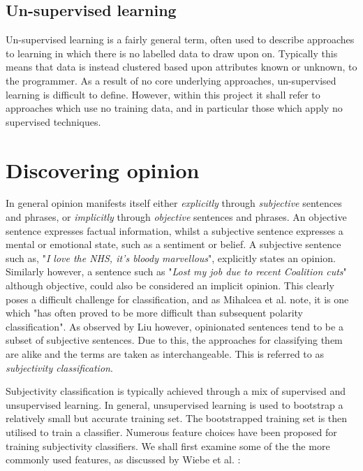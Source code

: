 \subsection{Un-supervised learning}

Un-supervised learning is a fairly general term, often used to describe approaches to learning in which there is no labelled data to draw upon on. Typically this means that data is instead clustered based upon attributes known or unknown, to the programmer. As a result of no core underlying approaches, un-supervised learning is difficult to define. However, within this project it shall refer to approaches which use no training data, and in particular those which apply no supervised techniques.

\section{Discovering opinion}
\label{background:discovering_opinion}

In general opinion manifests itself either \emph{explicitly} through \emph{subjective} sentences and phrases, or \emph{implicitly} through \emph{objective} sentences and phrases. An objective sentence expresses factual information, whilst a subjective sentence expresses a mental or emotional state, such as a sentiment or belief. A subjective sentence such as, "\emph{I love the NHS, it's bloody marvellous}", explicitly states an opinion. Similarly however, a sentence such as "\emph{Lost my job due to recent Coalition cuts}" although objective, could also be considered an implicit opinion. This clearly poses a difficult challenge for classification, and as Mihalcea et al. \cite{Mihalcea:2007uh} note, it is one which "has often proved to be more difficult than subsequent polarity classification". As observed by Liu \cite{Liu:2010tm} however, opinionated sentences tend to be a subset of subjective sentences. Due to this, the approaches for classifying them are alike and the terms are taken as interchangeable. This is referred to as \emph{subjectivity classification}.

Subjectivity classification is typically achieved through a mix of supervised and unsupervised learning. In general, unsupervised learning is used to bootstrap a relatively small but accurate training set. The bootstrapped training set is then utilised to train a classifier. Numerous feature choices have been proposed for training subjectivity classifiers. We shall first examine some of the the more commonly used features, as discussed by Wiebe et al. \cite{Wiebe:1999cj}:

